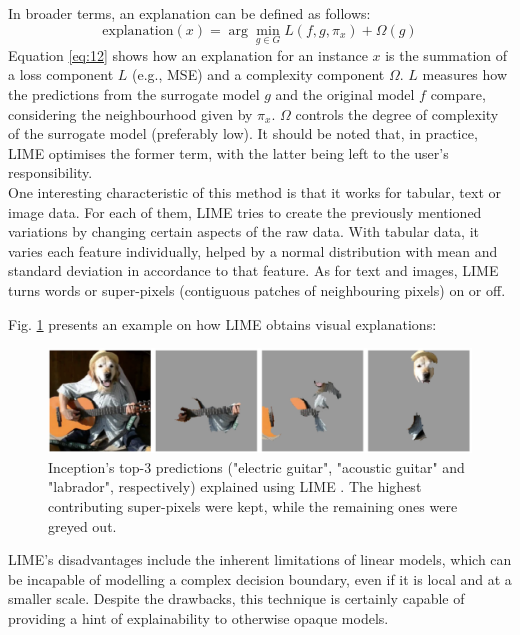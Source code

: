 In broader terms, an explanation can be defined 
as follows:
\begin{equation}
    \text{explanation}(x) = \arg \min_{g \in G} L(f,g,\pi_{x}) + \Omega(g)
    \label{eq:12}
\end{equation}
Equation \ref{eq:12} shows how an explanation for an instance $x$ is the summation of a loss component $L$ (e.g., \ac{MSE}) and a complexity component $\Omega$. $L$ measures how the predictions from the surrogate model $g$ and the original model $f$ compare, considering the neighbourhood given by $\pi_{x}$. $\Omega$ controls the degree of complexity of the surrogate model (preferably low). It should be noted that, in practice, \ac{LIME} optimises the former term, with the latter being left to the user's responsibility.\\

One interesting characteristic of this method is that it works for tabular, text or image data. For each of them, \ac{LIME} tries to create the previously mentioned variations by changing certain aspects of the raw data. With tabular data, it varies each feature individually, helped by a normal distribution with mean and standard deviation in accordance to that feature. As for text and images, \ac{LIME} turns words or super-pixels (contiguous patches of neighbouring pixels) on or off. 

Fig. \ref{fig:lime} presents an example on how \ac{LIME} obtains visual explanations:

\begin{figure}[h]
\centering
\includegraphics[width=360pt]{figures/figure_22.pdf}
\caption{Inception's top-$3$ predictions ("electric guitar", "acoustic guitar" and "labrador", respectively) explained using \ac{LIME} \cite{lime}. The highest contributing super-pixels were kept, while the remaining ones were greyed out.}
\label{fig:lime}
\end{figure}

\ac{LIME}'s disadvantages include the inherent limitations of linear models, which can be incapable of modelling a complex decision boundary, even if it is local and at a smaller scale. Despite the drawbacks, this technique is certainly capable of providing a hint of explainability to otherwise opaque models. \\

